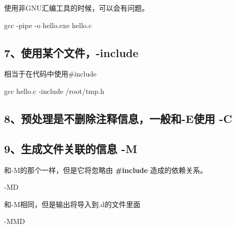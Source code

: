 \documentclass[
]{article}
\newenvironment{Shaded}{}{}
\newcommand{\NormalTok}[1]{#1}
\begin{document}
使用非GNU汇编工具的时候，可以会有问题。

\begin{Shaded}
\begin{Highlighting}[]
\NormalTok{gcc {-}pipe {-}o hello.exe hello.c}
\end{Highlighting}
\end{Shaded}

\hypertarget{7ux4f7fux7528ux67d0ux4e2aux6587ux4ef6-include}{%
\subsection{7、使用某个文件，-include}\label{7ux4f7fux7528ux67d0ux4e2aux6587ux4ef6-include}}

相当于在代码中使用\#include

\begin{Shaded}
\begin{Highlighting}[]
\NormalTok{gcc hello.c {-}include /root/tmp.h}
\end{Highlighting}
\end{Shaded}

\hypertarget{8ux9884ux5904ux7406ux662fux4e0dux5220ux9664ux6ce8ux91caux4fe1ux606fux4e00ux822cux548c-eux4f7fux7528--c}{%
\subsection{8、预处理是不删除注释信息，一般和-E使用
-C}\label{8ux9884ux5904ux7406ux662fux4e0dux5220ux9664ux6ce8ux91caux4fe1ux606fux4e00ux822cux548c-eux4f7fux7528--c}}

\hypertarget{9ux751fux6210ux6587ux4ef6ux5173ux8054ux7684ux4fe1ux606f--m}{%
\subsection{9、生成文件关联的信息
-M}\label{9ux751fux6210ux6587ux4ef6ux5173ux8054ux7684ux4fe1ux606f--m}}

和-M的那个一样，但是它将忽略由 \textbf{\#include} 造成的依赖关系。

\begin{Shaded}
\begin{Highlighting}[]
\NormalTok{{-}MD}
\end{Highlighting}
\end{Shaded}

和-M相同，但是输出将导入到.d的文件里面

\begin{Shaded}
\begin{Highlighting}[]
\NormalTok{{-}MMD}
\end{Highlighting}
\end{Shaded}
\end{document}
